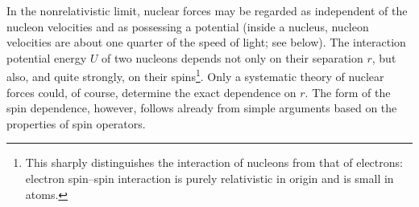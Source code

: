 In the nonrelativistic limit, nuclear forces may be regarded as independent of the nucleon velocities and as possessing a potential (inside a nucleus, nucleon velocities are about one quarter of the speed of light; see below).
The interaction potential energy $U$ of two nucleons depends not only on their separation $r$, but also, and quite strongly, on their spins\footnote{This sharply distinguishes the interaction of nucleons from that of electrons: electron spin--spin interaction is purely relativistic in origin and is small in atoms.}.
Only a systematic theory of nuclear forces could, of course, determine the exact dependence on $r$.
The form of the spin dependence, however, follows already from simple arguments based on the properties of spin operators.
